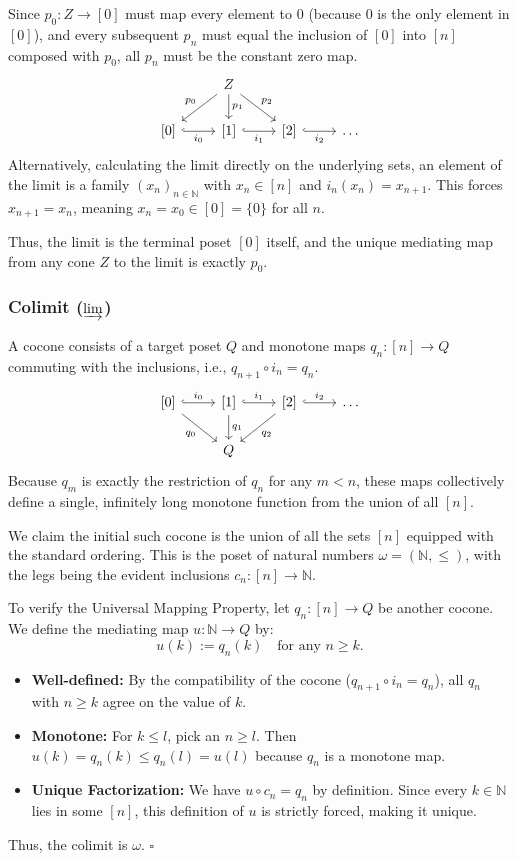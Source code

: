 Since $p_0: Z \to [0]$ must map every element to $0$ (because $0$ is the only
element in $[0]$), and every subsequent $p_n$ must equal the inclusion of $[0]$
into $[n]$ composed with $p_0$, all $p_n$ must be the constant zero map.
\[
\begin{tikzcd}
& Z \arrow[dl, "p_0"'] \arrow[d, "p_1"] \arrow[dr, "p_2"] & \\
{[0]} \arrow[r, hook, "i_0"'] & {[1]} \arrow[r, hook, "i_1"'] & {[2]} \arrow[r, hook, "i_2"'] & \dots
\end{tikzcd}
\]
Alternatively, calculating the limit directly on the underlying sets, an
element of the limit is a family $(x_n)_{n \in \mathbb{N}}$ with $x_n \in [n]$
and $i_n(x_n) = x_{n+1}$. This forces $x_{n+1} = x_n$, meaning
$x_n = x_0 \in [0] = \{0\}$ for all $n$.

Thus, the limit is the terminal poset $[0]$ itself, and the unique mediating
map from any cone $Z$ to the limit is exactly $p_0$.

\subsubsection*{Colimit ($\varinjlim$)}

A cocone consists of a target poset $Q$ and monotone maps $q_n: [n] \to Q$
commuting with the inclusions, i.e., $q_{n+1} \circ i_n = q_n$.
\[
\begin{tikzcd}
{[0]} \arrow[r, hook, "i_0"] \arrow[dr, "q_0"'] & {[1]} \arrow[r, hook, "i_1"] \arrow[d, "q_1"] & {[2]} \arrow[r, hook, "i_2"] \arrow[dl, "q_2"] & \dots \\
& Q & &
\end{tikzcd}
\]
Because $q_m$ is exactly the restriction of $q_n$ for any $m < n$, these maps
collectively define a single, infinitely long monotone function from the union
of all $[n]$.

We claim the initial such cocone is the union of all the sets $[n]$ equipped
with the standard ordering. This is the poset of natural numbers
$\omega = (\mathbb{N}, \leq)$, with the legs being the evident inclusions
$c_n: [n] \to \mathbb{N}$.

To verify the Universal Mapping Property, let $q_n: [n] \to Q$ be another
cocone. We define the mediating map $u: \mathbb{N} \to Q$ by:
\[
  u(k) := q_n(k) \quad \text{for any } n \geq k.
\]
\begin{itemize}
  \item \textbf{Well-defined:} By the compatibility of the cocone
    ($q_{n+1} \circ i_n = q_n$), all $q_n$ with $n \geq k$ agree on the value
    of $k$.
  \item \textbf{Monotone:} For $k \leq l$, pick an $n \geq l$. Then
    $u(k) = q_n(k) \leq q_n(l) = u(l)$ because $q_n$ is a monotone map.
  \item \textbf{Unique Factorization:} We have $u \circ c_n = q_n$ by
    definition. Since every $k \in \mathbb{N}$ lies in some $[n]$, this
    definition of $u$ is strictly forced, making it unique.
\end{itemize}
Thus, the colimit is $\omega$. \hfill$\square$

